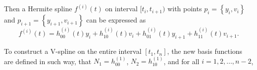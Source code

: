 Then a Hermite spline $f^{(i)}(t)$ on interval $[t_i,t_{i+1})$ with points $p_i=\left\lbrace y_i,v_i\right\rbrace$ and $p_{i+1}=\left\lbrace y_{i+1},v_{i+1} \right\rbrace$  can be expressed as
\begin{equation}
f^{(i)}(t)=h_{00}^{(i)}(t)y_i+h_{10}^{(i)}(t)v_i+h_{01}^{(i)}(t)y_{i+1} +h_{11}^{(i)}(t)v_{i+1}.
\end{equation}

To construct a V-spline on the entire interval $[t_1,t_n]$, the new basis functions are defined in such way, that $N_1 = h^{(1)}_{00}$, $N_2 = h^{(1)}_{10}$, and for all $i=1,2,\ldots,n-2$, 


